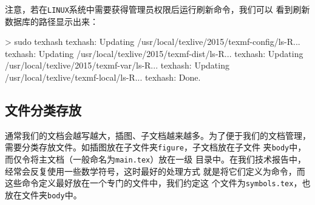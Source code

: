 注意，若在\texttt{LINUX}系统中需要获得管理员权限后运行刷新命令，我们可以
看到刷新数据库的路径显示出来：

\begin{cmd}
  > sudo texhash
  texhash: Updating /usr/local/texlive/2015/texmf-config/ls-R...
  texhash: Updating /usr/local/texlive/2015/texmf-dist/ls-R...
  texhash: Updating /usr/local/texlive/2015/texmf-var/ls-R...
  texhash: Updating /usr/local/texlive/texmf-local/ls-R...
  texhash: Done.
\end{cmd}


\subsection{文件分类存放}

通常我们的文档会越写越大，插图、子文档越来越多。为了便于我们的文档管理，
需要分类存放文件。如插图放在子文件夹\texttt{figure}，子文档放在子文件
夹\texttt{body}中，而仅令将主文档（一般命名为\texttt{main.tex}）放在一级
目录中。在我们技术报告中，经常会反复使用一些数学符号，这时最好的处理方式
就是将它们定义为命令，而这些命令定义最好放在一个专门的文件中，我们约定这
个文件为\texttt{symbols.tex}，也放在文件夹\texttt{body}中。


